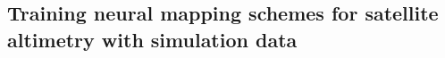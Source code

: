 

\begin{bibunit}

\chapter{Training neural mapping schemes for satellite altimetry with simulation data}







\end{bibunit}
